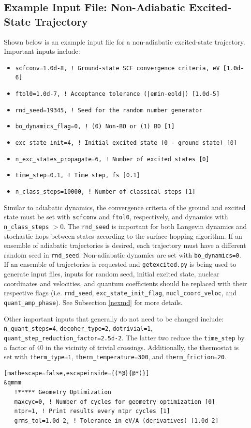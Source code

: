 \documentclass[letterpaper,12pt,titlepage]{article}
\begin{document}
\begin{appendix}
\subsection{Example Input File: Non-Adiabatic Excited-State Trajectory}
\label{input_nexmd}
Shown below is an example input file for a non-adiabatic excited-state trajectory.  Important inputs include:
\begin{itemize}
\item \verb+scfconv=1.0d-8, ! Ground-state SCF convergence criteria, eV [1.0d-6]+
\item \verb+ftol0=1.0d-7, ! Acceptance tolerance (|emin-eold|) [1.0d-5]+
\item \verb+rnd_seed=19345, ! Seed for the random number generator+
\item \verb+bo_dynamics_flag=0, ! (0) Non-BO or (1) BO [1]+
\item \verb+exc_state_init=4, ! Initial excited state (0 - ground state) [0]+
\item \verb+n_exc_states_propagate=6, ! Number of excited states [0]+
\item \verb+time_step=0.1, ! Time step, fs [0.1]+
\item \verb+n_class_steps=10000, ! Number of classical steps [1]+
\end{itemize}
Similar to adiabatic dynamics, the convergence criteria of the ground and excited state must be set with \verb+scfconv+ and \verb+ftol0+, respectively, and dynamics with \verb+n_class_steps+ $>0$.  The \verb+rnd_seed+ is important for both Langevin dynamics and stochastic hops between states according to the surface hopping algorithm.\cite{tully1990molecular}  If an ensemble of adiabatic trajectories is desired, each trajectory must have a different random seed in \verb+rnd_seed+.  Non-adiabatic dynamics are set with \verb+bo_dynamics=0+.  If an ensemble of trajectories is requested and \verb+getexcited.py+ is being used to generate input files, inputs for random seed, initial excited state, nuclear coordinates and velocities, and quantum coefficients should be replaced with their respective flags (i.e. \verb+rnd_seed+, \verb+exc_state_init_flag+, \verb+nucl_coord_veloc+, and \verb+quant_amp_phase+).  See Subsection \ref{nexmd} for more details.

Other important inputs that generally do not need to be changed include: \verb+n_quant_steps=4+, \verb+decoher_type=2+, \verb+dotrivial=1+, \verb+quant_step_reduction_factor=2.5d-2+.  The latter two reduce the \verb+time_step+ by a factor of 40 in the vicinity of trivial crossings.  Additionally, the thermostat is set with \verb+therm_type=1+, \verb+therm_temperature=300+, and \verb+therm_friction=20+.
\begin{lstlisting}[mathescape=false,escapeinside={(*@}{@*)}]
&qmmm
   !***** Geometry Optimization
   maxcyc=0, ! Number of cycles for geometry optimization [0]
   ntpr=1, ! Print results every ntpr cycles [1]
   grms_tol=1.0d-2, ! Tolerance in eV/A (derivatives) [1.0d-2]


\end{lstlisting}
\end{appendix}
\end{document}
